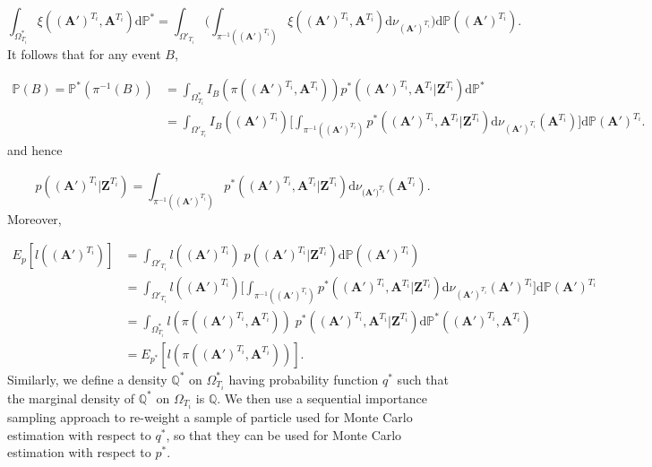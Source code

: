 \documentclass[11pt,a4paper]{article}
\newcommand{\D}{\mathrm{d}}
\renewcommand{\vec}[1]{\mathbf{#1}}
\begin{document}
\begin{equation*}
    \int_{\Omega^*_{T_i}} \xi((\vec{A}')^{T_i}, \vec{A}^{T_i}) \D \mathbb{P}^* = \int_{\Omega'_{T_i}} \Bigg( \int_{\pi^{-1}((\vec{A}')^{T_i})} \xi((\vec{A}')^{T_i}, \vec{A}^{T_i}) \D \nu_{(\vec{A}')^{T_i}}  \Bigg) \D \mathbb{P}((\vec{A}')^{T_i}).
\end{equation*}
It follows that for any event $B$,

\begin{align*}
    \mathbb{P}(B) = \mathbb{P}^*(\pi^{-1}(B)) &= \int_{\Omega^*_{T_i}} I_B (\pi((\vec{A}')^{T_i}, \vec{A}^{T_i})) p^* ((\vec{A}')^{T_i}, \vec{A}^{T_i} | \vec{Z}^{T_i}) \D \mathbb{P}^* \\ 
    &= \int_{\Omega'_{T_i}} I_B ((\vec{A}')^{T_i}) \Bigg[ \int_{\pi^{-1}((\vec{A}')^{T_i})} p^* ((\vec{A}')^{T_i}, \vec{A}^{T_i} | \vec{Z}^{T_i}) \D \nu_{(\vec{A}')^{T_i}} (\vec{A}^{T_i}) \Bigg] \D \mathbb{P} (\vec{A}')^{T_i}.
\end{align*}
and hence

\begin{equation*}
    p((\vec{A}')^{T_i} | \vec{Z}^{T_i}) = \int_{\pi^{-1}((\vec{A}')^{T_i})} p^*((\vec{A}')^{T_i}, \vec{\vec{A}}^{T_i} | \vec{Z}^{T_i})\D \nu_{(\vec{A')}^{T_i}} (\vec{A}^{T_i}).
\end{equation*}
Moreover,

\begin{align*}
    E_{p}[l(\vec{(A')}^{T_i})]  &= \int_{\Omega'_{T_i}} l(\vec{(A')}^{T_i})\; p(\vec{(A')}^{T_i} | \vec{Z}^{T_i}) \D \mathbb{P}(\vec{(A')}^{T_i}) \\
    &= \int_{\Omega'_{T_i}} l(\vec{(A')}^{T_i})\Bigg[\int_{\pi^{-1}((\vec{A}')^{T_i})} p^*(\vec{(A')}^{T_i}, \vec{A}^{T_i} | \vec{Z}^{T_i}) \D \nu_{(\vec{A}')^{T_i}}(\vec{A}')^{T_i} \Bigg] \D \mathbb{P}{(\vec{A}')}^{T_i} \\ 
    &= \int_{\Omega^*_{T_i}} l(\pi(\vec{(A')}^{T_i}, \vec{A}^{T_i}))\; p^*(\vec{(A')}^{T_i}, \vec{A}^{T_i} | \vec{Z}^{T_i}) \D \mathbb{P}^*((\vec{A}')^{T_i}, \vec{A}^{T_i}) \\ 
    &= E_{p^*}[l(\pi (\vec{(A')}^{T_i}, \vec{A}^{T_i}))].
\end{align*}
Similarly, we define a density $\mathbb{Q}^*$ on $\Omega^*_{T_i}$ having probability function $q^*$ such that the marginal density of $\mathbb{Q}^*$ on $\Omega_{T_i}$ is $\mathbb{Q}$. We then use a sequential importance sampling approach to re-weight a sample of particle used for Monte Carlo estimation with respect to $q^*$, so that they can be used for Monte Carlo estimation with respect to $p^*$.
\end{document}
